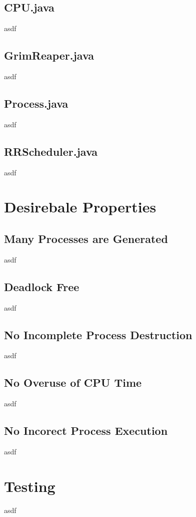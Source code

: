 \documentclass[]{article}
\begin{document}
\subsection*{CPU.java}
asdf

\vspace{2mm}

\subsection*{GrimReaper.java}
asdf 

\vspace{2mm}

\subsection*{Process.java}
asdf 

\vspace{2mm}

\subsection*{RRScheduler.java}
asdf

\vspace{2mm}

\section*{Desirebale Properties}
\subsection*{Many Processes are Generated}
asdf

\vspace{2mm}

\subsection*{Deadlock Free}
asdf

\vspace{2mm}

\subsection*{No Incomplete Process Destruction}
asdf

\vspace{2mm}

\subsection*{No Overuse of CPU Time}
asdf

\vspace{2mm}

\subsection*{No Incorect Process Execution}
asdf 

\vspace{2mm}

\section*{Testing}
asdf 
\end{document}
